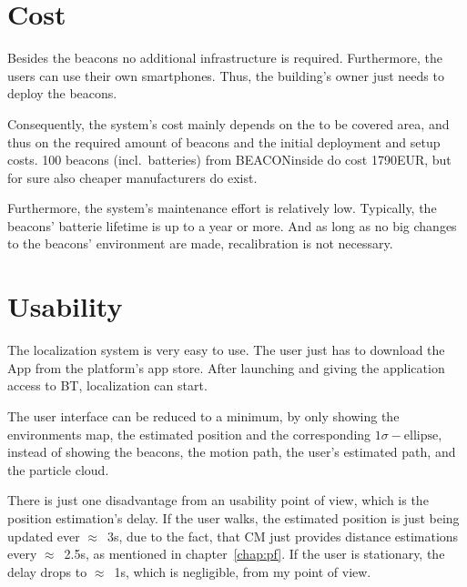 \section{Cost}
Besides the beacons no additional infrastructure is required. Furthermore, the users can use their own smartphones. Thus, the building's owner just needs to deploy the beacons.

Consequently, the system's cost mainly depends on the to be covered area, and thus on the required amount of beacons and the initial deployment and setup costs. 100 beacons (incl.\ batteries) from BEACONinside do cost 1790EUR, but for sure also cheaper manufacturers do exist.

Furthermore, the system's maintenance effort is relatively low. Typically, the beacons' batterie lifetime is up to a year or more. And as long as no big changes to the beacons' environment are made, recalibration is not necessary.

\section{Usability}
The localization system is very easy to use. The user just has to download the App from the platform's app store. After launching and giving the application access to \acl{BT}, localization can start.

The user interface can be reduced to a minimum, by only showing the environments map, the estimated position and the corresponding $1\sigma-\text{ellipse}$, instead of showing the beacons, the motion path, the user's estimated path, and the particle cloud.

There is just one disadvantage from an usability point of view, which is the position estimation's delay. If the user walks, the estimated position is just being updated ever $\approx$~3s, due to the fact, that \acs{CM} just provides distance estimations every $\approx$~2.5s, as mentioned in chapter~\ref{chap:pf}. If the user is stationary, the delay drops to $\approx$~1s, which is negligible, from my point of view.
